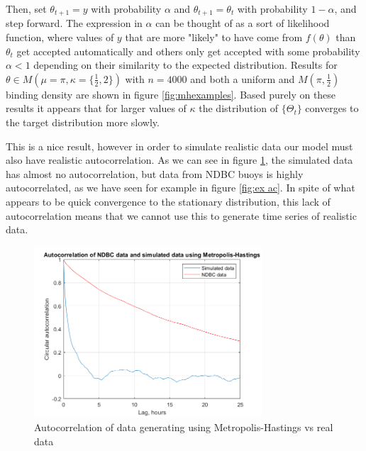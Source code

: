 \documentclass[12pt]{article}
\numberwithin{equation}{section}
\numberwithin{figure}{section}
\begin{document}
Then, set $\theta_{t+1}=y$ with probability $\alpha$ and $\theta_{t+1}=\theta_t$ with probability $1-\alpha$, and step forward. The expression in $\alpha$ can be thought of as a sort of likelihood function, where values of $y$ that are more "likely" to have come from $f(\theta)$ than $\theta_t$ get accepted automatically and others only get accepted with some probability $\alpha <1$ depending on their similarity to the expected distribution. Results for $\theta \in M(\mu = \pi, \kappa = \{\frac{1}{2}, 2\})$ with $n=4000$ and both a uniform and $M(\pi,\frac{1}{2})$ binding density are shown in figure \ref{fig:mhexamples}. Based purely on these results it appears that for larger values of $\kappa$ the distribution of $\{\Theta_t\}$ converges to the target distribution more slowly. 

This is a nice result, however in order to simulate realistic data our model must also have realistic autocorrelation. As we can see in figure \ref{fig:mh ac}, the simulated data has almost no autocorrelation, but data from NDBC buoys is highly autocorrelated, as we have seen for example in figure \ref{fig:ex ac}. In spite of what appears to be quick convergence to the stationary distribution, this lack of autocorrelation means that we cannot use this to generate time series of realistic data.

\begin{figure}[h]
\centering
\includegraphics[width=85mm]{New Folder/ac data v model.png}
\caption{Autocorrelation of data generating using Metropolis-Hastings vs real data}\label{fig:mh ac}
\end{figure}
\end{document}
